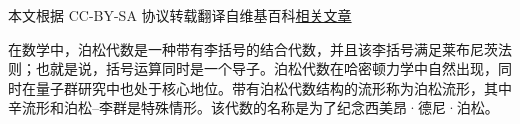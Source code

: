 
本文根据 CC-BY-SA 协议转载翻译自维基百科\href{https://en.wikipedia.org/wiki/Poisson_algebra}{相关文章}

在数学中，泊松代数是一种带有李括号的结合代数，并且该李括号满足莱布尼茨法则；也就是说，括号运算同时是一个导子。泊松代数在哈密顿力学中自然出现，同时在量子群研究中也处于核心地位。带有泊松代数结构的流形称为泊松流形，其中辛流形和泊松–李群是特殊情形。该代数的名称是为了纪念西美昂·德尼·泊松。

